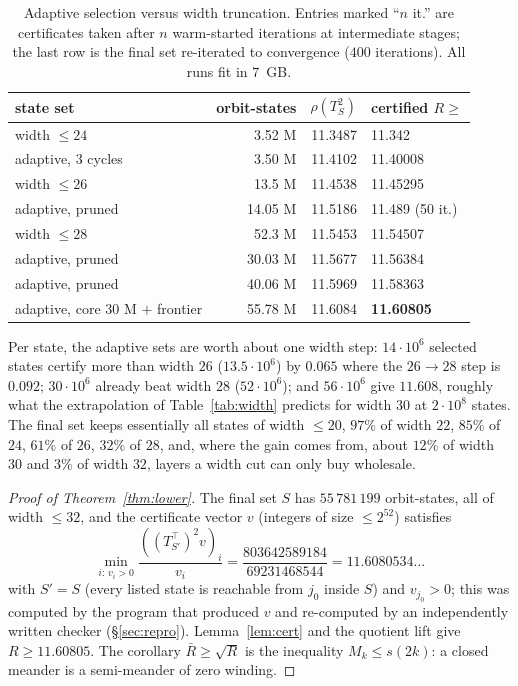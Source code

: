 \documentclass[11pt]{amsart}
\theoremstyle{definition}
\newcommand{\Rb}{\bar R}
\newcommand{\ttop}{^{\!\top}}
\begin{document}
\begin{table}[h]
\centering
\begin{tabular}{lrrl}
\toprule
state set & orbit-states & $\rho(T_S^2)$ & certified $R\ge$\\
\midrule
width $\le24$ & 3.52 M & 11.3487 & 11.342\\
adaptive, 3 cycles & 3.50 M & 11.4102 & 11.40008\\
width $\le26$ & 13.5 M & 11.4538 & 11.45295\\
adaptive, pruned & 14.05 M & 11.5186 & 11.489 (50 it.)\\
width $\le28$ & 52.3 M & 11.5453 & 11.54507\\
adaptive, pruned & 30.03 M & 11.5677 & 11.56384\\
adaptive, pruned & 40.06 M & 11.5969 & 11.58363\\
adaptive, core $30$ M $+$ frontier & 55.78 M & 11.6084 & \textbf{11.60805}\\
\bottomrule
\end{tabular}
\caption{Adaptive selection versus width truncation. Entries marked ``$n$ it.'' are certificates taken after $n$ warm-started iterations at intermediate stages; the last row is the final set re-iterated to convergence ($400$ iterations). All runs fit in $7$~GB.}\label{tab:adaptive}
\end{table}

Per state, the adaptive sets are worth about one width step: $14\cdot10^6$ selected states certify more than width $26$ ($13.5\cdot10^6$) by $0.065$ where the $26\to28$ step is $0.092$; $30\cdot10^6$ already beat width $28$ ($52\cdot10^6$); and $56\cdot10^6$ give $11.608$, roughly what the extrapolation of Table~\ref{tab:width} predicts for width $30$ at $2\cdot10^8$ states. The final set keeps essentially all states of width $\le20$, $97\%$ of width $22$, $85\%$ of $24$, $61\%$ of $26$, $32\%$ of $28$, and, where the gain comes from, about $12\%$ of width $30$ and $3\%$ of width $32$, layers a width cut can only buy wholesale.

\begin{proof}[Proof of Theorem~\ref{thm:lower}]
The final set $S$ has $55\,781\,199$ orbit-states, all of width $\le32$, and the certificate vector $v$ (integers of size $\le2^{52}$) satisfies
\[
\min_{i:\,v_i>0}\frac{((T_{S'}\ttop)^2v)_i}{v_i}=\frac{803642589184}{69231468544}=11.6080534\ldots
\]
with $S'=S$ (every listed state is reachable from $j_0$ inside $S$) and $v_{j_0}>0$; this was computed by the program that produced $v$ and re-computed by an independently written checker (\S\ref{sec:repro}). Lemma~\ref{lem:cert} and the quotient lift give $R\ge11.60805$. The corollary $\Rb\ge\sqrt R$ is the inequality $M_k\le s(2k)$: a closed meander is a semi-meander of zero winding.
\end{proof}
\end{document}
